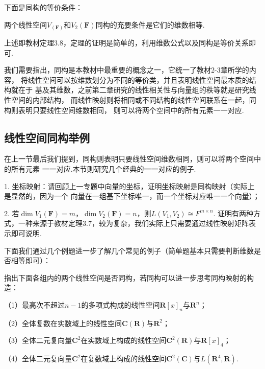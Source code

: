 下面是同构的等价条件：
\begin{theorem}
	两个线性空间$V_(\mathbf{F})$和$V_2(\mathbf{F})$同构的充要条件是它们的维数相等.
\end{theorem}
上述即教材定理3.8，定理的证明是简单的，利用维数公式以及同构是等价关系即可.

我们需要指出，同构是本教材中最重要的概念之一，它统一了教材2-3章所学的内容，
将线性空间可以按维数划分为不同的等价类，并且表明线性空间最本质的结构就在于
基及其维数，之前第二章研究的线性相关性与向量组的秩等就是研究线性空间的内部结构，
而线性映射则将相同或不同结构的线性空间联系在一起，同构则表明只要线性空间维数相同，
则可以将两个空间中的所有元素一一对应.
\subsection{线性空间同构举例}
在上一节最后我们提到，同构则表明只要线性空间维数相同，则可以将两个空间中的所有元素
一一对应.本节则研究几个经典的一一对应的例子.

1. 坐标映射：请回顾上一专题中向量的坐标，证明坐标映射是同构映射（实际上是显然的，因为一个
向量在一组基下坐标唯一，而一个坐标对应唯一一个向量）；

2. 若$\dim V_1(\mathbf{F})=m$，$\dim V_2(\mathbf{F})=n$，则$L(V_1,V_2) \cong F^{m \times n}$.
证明有两种方式，一种来源于教材定理3.7，较为复杂，我们实际上只需要通过线性映射矩阵表示即可说明.

下面我们通过几个例题进一步了解几个常见的例子（简单题基本只需要判断维数是否相等即可）：
\begin{example}
	指出下面各组内的两个线性空间是否同构，若同构可以进一步思考同构映射的构造：

	\textup{（1）}最高次不超过$n-1$的多项式构成的线性空间$\mathbf{R}[x]_n$与$\mathbf{R}^n$；

	\textup{（2）}全体复数在实数域上的线性空间$\mathbf{C}(\mathbf{R})$与$\mathbf{R}^2$；

	\textup{（3）}全体二元复向量$\mathbf{C}^2$在实数域上构成的线性空间$\mathbf{C}^2(\mathbf{R})$与$\mathbf{R}[x]_4$；

	\textup{（4）}全体二元复向量$\mathbf{C}^2$在复数域上构成的线性空间$\mathbf{C}^2(\mathbf{C})$与$L(\mathbf{R}^4,\mathbf{R})$.
\end{example}

